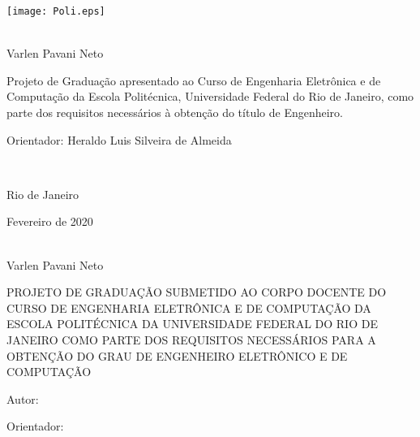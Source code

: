 \texttt{[image: Poli.eps]}

\begin{center}
\large{\titulo{}}\\
   \vspace{2cm}
\large{Varlen Pavani Neto}\\
\end{center}
   \vspace{3cm}
\hspace{7cm}
\hfill \parbox{8.0cm}{Projeto de Graduação apresentado ao Curso de Engenharia Eletrônica e de Computação da Escola Politécnica, Universidade Federal do Rio de Janeiro, como parte dos requisitos necessários à obtenção do título de Engenheiro.\\}
   \vspace{2cm}
\hfill \parbox{8.0cm}{Orientador: Heraldo Luis Silveira de Almeida} \\
   \vspace{2cm}
\begin{center}
Rio de Janeiro

Fevereiro de 2020
\end{center}


\pagebreak


\begin{center}
\large{\titulo{}}\\
   \vspace{1cm}
\large{Varlen Pavani Neto}\\
\end{center}
   \vspace{2cm}
PROJETO DE GRADUAÇÃO SUBMETIDO AO CORPO DOCENTE DO CURSO DE ENGENHARIA ELETRÔNICA E DE COMPUTAÇÃO DA ESCOLA POLITÉCNICA DA UNIVERSIDADE FEDERAL DO RIO DE JANEIRO COMO PARTE DOS REQUISITOS NECESSÁRIOS PARA A OBTENÇÃO DO GRAU DE ENGENHEIRO ELETRÔNICO E DE COMPUTAÇÃO

   \vspace{1cm}
Autor:
      \vspace{0.5cm}
      \begin{flushright}
         \parbox{10cm}{
            \hrulefill

            \vspace{-.375cm}

            \vspace{0.1cm}
         }
      \end{flushright}


Orientador:
      \vspace{0.5cm}
      \begin{flushright}
         \parbox{10cm}{
            \hrulefill

            \vspace{-.375cm}

            \vspace{0.1cm}
         }
      \end{flushright}

